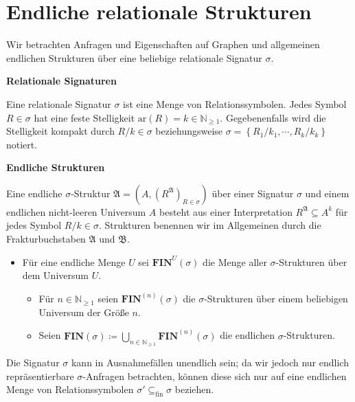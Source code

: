 \section{Endliche relationale Strukturen}

Wir betrachten Anfragen und Eigenschaften auf Graphen und allgemeinen
endlichen Strukturen über eine beliebige relationale Signatur $\sigma$.
\begin{defn}
\textbf{Relationale Signaturen}

Eine relationale Signatur $\sigma$ ist eine Menge von Relationssymbolen.
Jedes Symbol $R\in\sigma$ hat eine feste Stelligkeit $\mathrm{ar}\left(R\right)=k\in\mathbb{N}_{\geqslant1}$.
Gegebenenfalls wird die Stelligkeit kompakt durch $R/k\in\sigma$
beziehungsweise $\sigma=\left\{ R_{1}/k_{1},\cdots,R_{k}/k_{k}\right\} $
notiert.
\end{defn}
%
\begin{defn}
\textbf{Endliche Strukturen}

Eine endliche $\sigma$-Struktur $\mathfrak{A}=\left(A,\left(R^{\mathfrak{A}}\right)_{R\in\sigma}\right)$
über einer Signatur $\sigma$ und einem endlichen nicht-leeren Universum
$A$ besteht aus einer Interpretation $R^{\mathfrak{A}}\subseteq A^{k}$
für jedes Symbol $R/k\in\sigma$. Strukturen benennen wir im Allgemeinen
durch die Frakturbuchstaben $\mathfrak{A}$ und $\mathfrak{B}$.

\end{defn}
\begin{itemize}
\item Für eine endliche Menge $U$ sei $\mathbf{FIN}^{U}\left(\sigma\right)$
die Menge aller $\sigma$-Strukturen über dem Universum $U$.
\begin{itemize}
\item Für $n\in\mathbb{N}_{\geqslant1}$ seien $\mathbf{FIN}^{\left(n\right)}\left(\sigma\right)$
die $\sigma$-Strukturen über einem beliebigen Universum der Größe
$n$.
\item Seien $\mathbf{FIN}\left(\sigma\right)\coloneqq\bigcup_{n\in\mathbb{N}_{\geqslant1}}\mathbf{FIN}^{\left(n\right)}\left(\sigma\right)$
die endlichen $\sigma$-Strukturen.
\end{itemize}
\end{itemize}
Die Signatur $\sigma$ kann in Ausnahmefällen unendlich sein; da wir
jedoch nur endlich repräsentierbare $\sigma$-Anfragen betrachten,
können diese sich nur auf eine endlichen Menge von Relationssymbolen
$\sigma'\subseteq_{\mathrm{fin}}\sigma$ beziehen.

